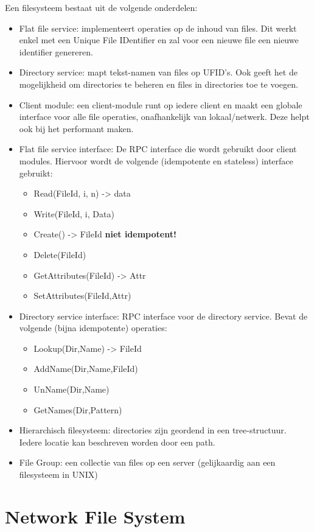 \documentclass[../samenvatting.tex]{subfiles}
\begin{document}
Een filesysteem bestaat uit de volgende onderdelen:
\begin{itemize}
	\item Flat file service: implementeert operaties op de inhoud van files. Dit werkt enkel met een Unique File IDentifier en zal voor een nieuwe file een nieuwe identifier genereren.
	\item Directory service: mapt tekst-namen van files op UFID's. Ook geeft het de mogelijkheid om directories te beheren en files in directories toe te voegen.
	\item Client module: een client-module runt op iedere client en maakt een globale interface voor alle file operaties, onafhankelijk van lokaal/netwerk. Deze helpt ook bij het performant maken.
	\item Flat file service interface: De RPC interface die wordt gebruikt door client modules. Hiervoor wordt de volgende (idempotente en stateless) interface gebruikt:
	\begin{itemize}
		\item Read(FileId, i, n) -> data
		\item Write(FileId, i, Data)
		\item Create() -> FileId \textbf{niet idempotent!}
		\item Delete(FileId)
		\item GetAttributes(FileId) -> Attr
		\item SetAttributes(FileId,Attr)
	\end{itemize}
	\item Directory service interface: RPC interface voor de directory service. Bevat de volgende (bijna idempotente) operaties:
	\begin{itemize}
		\item Lookup(Dir,Name) -> FileId
		\item AddName(Dir,Name,FileId)
		\item UnName(Dir,Name)
		\item GetNames(Dir,Pattern)
	\end{itemize}
	\item Hierarchisch filesysteem: directories zijn geordend in een tree-structuur. Iedere locatie kan beschreven worden door een path.
	\item File Group: een collectie van files op een server (gelijkaardig aan een filesysteem in UNIX)
\end{itemize}

\section{Network File System}
\end{document}

